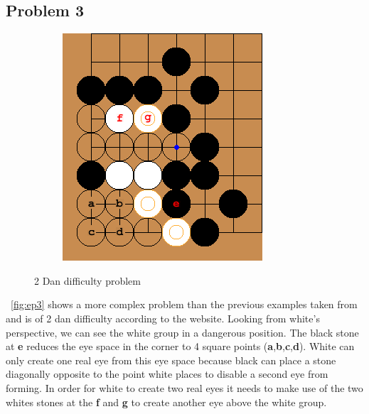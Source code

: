 \documentclass{l4proj}
\newcommand{\bo}[1]{\textbf{#1}}
\begin{document}
\subsection{Problem 3}

\begin{figure}[!ht]
\centering
\begin{subfigure}[b]{0.30\textwidth}
\includegraphics[width=\textwidth]{ep3/1.png}
\end{subfigure}
\caption{2 Dan difficulty problem}
\label{fig:ep3}
\end{figure}

~\autoref{fig:ep3} shows a more complex problem than the previous examples taken from \cite{GoProblems} and is of 2 dan difficulty according to the website. Looking from white’s perspective, we can see the white group in a dangerous position. The black stone at \bo{e} reduces the eye space in the corner to 4 square points (\bo{a},\bo{b},\bo{c},\bo{d}). White can only create one real eye from this eye space because black can place a stone diagonally opposite to the point white places to disable a second eye from forming. In order for white to create two real eyes it needs to make use of the two whites stones at the \bo{f} and \bo{g} to create another eye above the white group.
\end{document}
